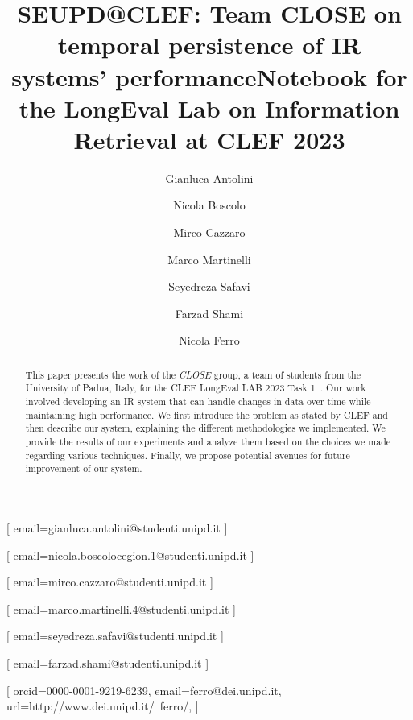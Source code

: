 \documentclass{ceurart}
\begin{document}


\title{SEUPD@CLEF: Team CLOSE on temporal persistence of IR systems' performance}
\title[mode=sub]{Notebook for the LongEval Lab on Information Retrieval at CLEF 2023}

\author[1]{Gianluca Antolini}[%
email=gianluca.antolini@studenti.unipd.it
]

\author[1]{Nicola Boscolo}[%
email=nicola.boscolocegion.1@studenti.unipd.it
]

\author[1]{Mirco Cazzaro}[%
email=mirco.cazzaro@studenti.unipd.it
]

\author[1]{Marco Martinelli}[%
email=marco.martinelli.4@studenti.unipd.it
]

\author[1]{Seyedreza Safavi}[%
email=seyedreza.safavi@studenti.unipd.it
]

\author[1]{Farzad Shami}[%
email=farzad.shami@studenti.unipd.it
]

\author[1]{Nicola Ferro}[%
  orcid=0000-0001-9219-6239,
  email=ferro@dei.unipd.it,
  url=http://www.dei.unipd.it/~ferro/,
]

\address[1]{University of Padua, Italy}


\begin{abstract}
  This paper presents the work of the \textit{CLOSE} group, a team of students from the University of Padua, Italy, for the \ac{CLEF} LongEval LAB 2023 Task 1~\cite{cleflongeval}.
  Our work involved developing an \ac{IR} system that can handle changes in data over time while maintaining high performance.
  We first introduce the problem as stated by \ac{CLEF} and then describe our system, explaining the different methodologies we implemented.
  We provide the results of our experiments and analyze them based on the choices we made regarding various techniques.
  Finally, we propose potential avenues for future improvement of our system.
\end{abstract}
\end{document}
